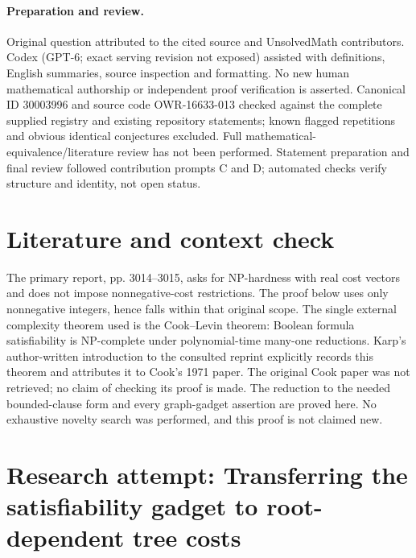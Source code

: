 \documentclass[11pt]{article}
\begin{document}
\paragraph{Preparation and review.}
Original question attributed to the cited source and UnsolvedMath contributors. Codex (GPT-6; exact serving revision not exposed) assisted with definitions, English summaries, source inspection and formatting. No new human mathematical authorship or independent proof verification is asserted. Canonical ID 30003996 and source code OWR-16633-013 checked against the complete supplied registry and existing repository statements; known flagged repetitions and obvious identical conjectures excluded. Full mathematical-equivalence/literature review has not been performed. Statement preparation and final review followed contribution prompts C and D; automated checks verify structure and identity, not open status.
\label{end:30003996}

\section{Literature and context check}
The primary report, pp. 3014--3015, asks for NP-hardness with real cost vectors and does not impose nonnegative-cost restrictions. The proof below uses only nonnegative integers, hence falls within that original scope. The single external complexity theorem used is the Cook--Levin theorem: Boolean formula satisfiability is NP-complete under polynomial-time many-one reductions. Karp's author-written introduction to the consulted reprint explicitly records this theorem and attributes it to Cook's 1971 paper. The original Cook paper was not retrieved; no claim of checking its proof is made. The reduction to the needed bounded-clause form and every graph-gadget assertion are proved here. No exhaustive novelty search was performed, and this proof is not claimed new.
\section{Research attempt: Transferring the satisfiability gadget to root-dependent tree costs}
\end{document}
